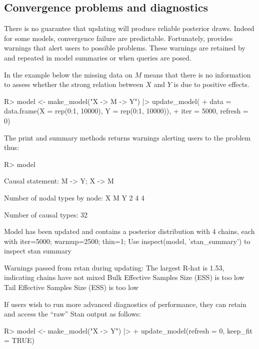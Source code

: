\documentclass[
  11pt,
  article]{jss}
\renewcommand{\texttt}[1]{\code{#1}}
\begin{document}
\subsection{Convergence problems and
diagnostics}\label{convergence-problems-and-diagnostics}

There is no guarantee that updating will produce reliable posterior
draws. Indeed for some models, convergence failure are predictable.
Fortunately, \texttt{stan} provides warnings that alert users to
possible problems. These warnings are retained by 
and repeated in model summaries or when queries are posed.

In the example below the missing data on \(M\) means that there is no
information to assess whether the strong relation between \(X\) and
\(Y\) is due to positive effects.

\begin{CodeInput}
R> model <- make_model("X -> M -> Y") |> update_model(
+    data = data.frame(X = rep(0:1, 10000), Y = rep(0:1, 10000)), 
+    iter = 5000, refresh = 0)
\end{CodeInput}

The print and summary methods returns warnings alerting users to the
problem thus:

\begin{CodeChunk}
\begin{CodeInput}
R> model
\end{CodeInput}

\begin{CodeOutput}

Causal statement: 
M -> Y; X -> M

Number of nodal types by node:
X M Y 
2 4 4 

Number of causal types: 32

Model has been updated and contains a posterior distribution with
4 chains, each with iter=5000; warmup=2500; thin=1;  
Use inspect(model, 'stan_summary') to inspect stan summary

Warnings passed from rstan during updating:
The largest R-hat is 1.53, indicating chains have not mixed
Bulk Effective Samples Size (ESS) is too low
Tail Effective Samples Size (ESS) is too low 
\end{CodeOutput}
\end{CodeChunk}

If users wish to run more advanced diagnostics of performance, they can
retain and access the ``raw'' Stan output as follows:

\begin{CodeInput}
R> model <- make_model("X -> Y") |> 
+    update_model(refresh = 0, keep_fit = TRUE)
\end{CodeInput}
\end{document}
